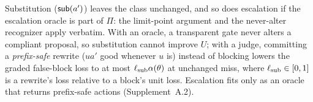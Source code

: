 Substitution ($\mathsf{sub}(a')$) leaves the class unchanged, and so does escalation if the escalation
oracle is part of $\Pi$: the limit-point argument and the never-alter recognizer apply verbatim. With an oracle, a transparent gate never alters a compliant proposal,
so substitution cannot improve $U$; with a judge, committing a \emph{prefix-safe} rewrite ($ua'$
good whenever $u$ is) instead of blocking lowers the graded false-block loss to at most
$\ell_{\rm sub}\alpha(\theta)$ at unchanged miss, where $\ell_{\rm sub}\in[0,1]$ is a rewrite's loss relative to a block's unit loss. Escalation fits only as an oracle that returns
prefix-safe actions (Supplement~A.2).
